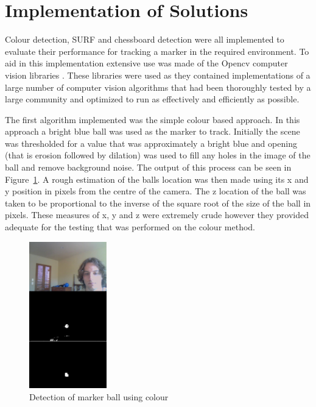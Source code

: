 \section{Implementation of Solutions}

Colour detection, SURF and chessboard detection were all implemented to evaluate their performance for tracking a marker in the required environment. To aid in this implementation extensive use was made of the Opencv computer vision libraries \cite{opencv}. These libraries were used as they contained implementations of a large number of computer vision algorithms that had been thoroughly tested by a large community and optimized to run as effectively and efficiently as possible.

The first algorithm implemented was the simple colour based approach. In this approach a bright blue ball was used as the marker to track. Initially the scene was thresholded for a value that was approximately  a bright blue and opening (that is erosion followed by dilation) was used to fill any holes in the image of the ball and remove background noise. The output of this process can be seen in Figure~\ref{ball}. A rough estimation of the balls location was then made using its x and y position in pixels from the centre of the camera. The z location of the ball was taken to be proportional to the inverse of the square root of the size of the ball in pixels. These measures of x, y and z were extremely crude however they provided adequate for the testing that was performed on the colour method.

\begin{figure}[ht]
	\begin{center}
		\includegraphics[width=0.3\textwidth]{2}
	\end{center}
	\caption{Detection of marker ball using colour}
	\label{ball}
\end{figure}

